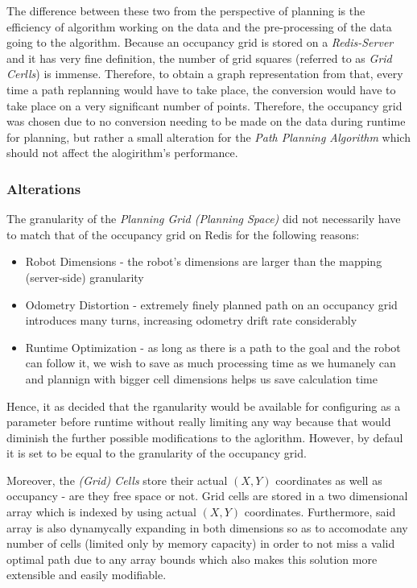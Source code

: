 \documentclass[11pt, a4paper]{article}
\begin{document}
The difference between these two from the perspective of planning is the efficiency of algorithm working on the data and the pre-processing of the data going to the algorithm. Because an occupancy grid is stored on a \textit{Redis-Server} and it has very fine definition, the number of grid squares (referred to as \textit{Grid Cerlls}) is immense. Therefore, to obtain a graph representation from that, every time a path replanning would have to take place, the conversion would have to take place on a very significant number of points. Therefore, the occupancy grid was chosen due to no conversion needing to be made on the data during runtime for planning, but rather a small alteration for the \textit{Path Planning Algorithm} which should not affect the alogirithm's performance.

\subsubsection{Alterations}

The granularity of the \textit{Planning Grid (Planning Space)} did not necessarily have to match that of the occupancy grid on Redis for the following reasons:


\begin{itemize}

	\item Robot Dimensions     - the robot's dimensions are larger than the mapping (server-side) granularity
	\item Odometry Distortion  - extremely finely planned path on an occupancy grid introduces many turns, increasing odometry drift rate considerably \cite{task2_report}
	\item Runtime Optimization - as long as there is a path to the goal and the robot can follow it, we wish to save as much processing time as we humanely can and plannign with bigger cell dimensions helps us save calculation time

\end{itemize}

Hence, it as decided that the rganularity would be available for configuring as a parameter before runtime without really limiting any way because that would diminish the further possible modifications to the aglorithm. However, by defaul it is set to be equal to the granularity of the occupancy grid.

Moreover, the \textit{(Grid) Cells} store their actual $(X ,Y)$ coordinates as well as occupancy - are they free space or not. Grid cells are stored in a two dimensional array which is indexed by using actual $(X ,Y)$ coordinates. Furthermore, said array is also dynamycally expanding in both dimensions so as to accomodate any number of cells (limited only by memory capacity) in order to not miss a valid optimal path due to any array bounds which also makes this solution more extensible and easily modifiable.
\end{document}
